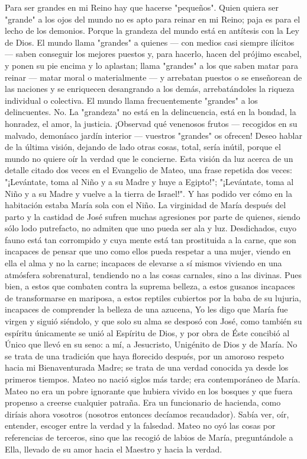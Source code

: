 \documentclass[12pt]{book} %
\begin{document}
Para ser grandes en mi Reino hay que hacerse "pequeños". Quien quiera ser "grande" a los ojos del mundo no es apto 
para reinar en mi Reino; paja es para el lecho de los demonios. Porque la grandeza del mundo está en antítesis con la Ley de Dios. 
El mundo llama "grandes" a quienes — con medios casi siempre ilícitos — saben conseguir los mejores puestos y, para hacerlo, hacen del prójimo escabel, y ponen su pie encima y lo aplastan; llama "grandes" a los que saben matar para reinar — matar moral o materialmente — y arrebatan puestos o se enseñorean de las naciones y se enriquecen desangrando a los demás, arrebatándoles la riqueza individual o colectiva. El mundo llama frecuentemente "grandes" a los delincuentes. No. La "grandeza" no está en la delincuencia, está en la bondad, la honradez, el amor, la justicia. ¡Observad qué venenosos frutos — recogidos en su malvado, demoníaco jardín interior — vuestros "grandes" os ofrecen! 
Deseo hablar de la última visión, dejando de lado otras cosas, total, sería inútil, porque el mundo no quiere oír la verdad 
que le concierne. Esta visión da luz acerca de un detalle citado dos veces en el Evangelio de Mateo, una frase repetida dos veces: "¡Levántate, toma al Niño y a su Madre y huye a Egipto!"; "¡Levántate, toma al Niño y a su Madre y vuelve a la tierra de Israel!". Y has podido ver cómo en la habitación estaba María sola con el Niño. 
 La virginidad de María después del parto y la castidad de José sufren muchas agresiones por parte de quienes, siendo sólo lodo putrefacto, no admiten que uno pueda ser ala y luz. Desdichados, cuyo fauno está tan corrompido y cuya mente está tan prostituida a la carne, que son incapaces de pensar que uno como ellos pueda respetar a una mujer, viendo en ella el alma y no la carne; incapaces de elevarse a sí mismos viviendo en una atmósfera sobrenatural, tendiendo no a las cosas carnales, sino a las divinas. 
Pues bien, a estos que combaten contra la suprema belleza, a estos gusanos incapaces de transformarse en mariposa, a 
estos reptiles cubiertos por la baba de su lujuria, incapaces de comprender la belleza de una azucena, Yo les digo que María fue virgen y siguió siéndolo, y que solo su alma se desposó con José, como también su espíritu únicamente se unió al Espíritu de Dios, y por obra de Éste concibió al Único que llevó en su seno: a mí, a Jesucristo, Unigénito de Dios y de María. 
No se trata de una tradición que haya florecido después, por un amoroso respeto hacia mi Bienaventurada Madre; se 
trata de una verdad conocida ya desde los primeros tiempos. 
Mateo no nació siglos más tarde; era contemporáneo de María. Mateo no era un pobre ignorante que hubiera vivido en los bosques y que fuera propenso a creerse cualquier patraña. Era un funcionario de hacienda, como diríais ahora vosotros (nosotros entonces decíamos recaudador). Sabía ver, oír, entender, escoger entre la verdad y la falsedad. Mateo no oyó las cosas por referencias de terceros, sino que las recogió de labios de María, preguntándole a Ella, llevado de su amor hacia el Maestro y hacia la verdad. 
\end{document}
